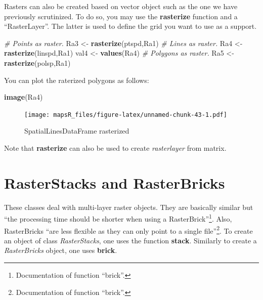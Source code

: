 \documentclass[]{report}
\newenvironment{Shaded}{\begin{snugshade}}{\end{snugshade}}
\newcommand{\CommentTok}[1]{\textcolor[rgb]{0.56,0.35,0.01}{\textit{#1}}}
\newcommand{\KeywordTok}[1]{\textcolor[rgb]{0.13,0.29,0.53}{\textbf{#1}}}
\newcommand{\NormalTok}[1]{#1}
\newcommand{\StringTok}[1]{\textcolor[rgb]{0.31,0.60,0.02}{#1}}
\let\rmarkdownfootnote\footnote%
\def\footnote{\protect\rmarkdownfootnote}
\begin{document}
Rasters can also be created based on vector object such as the one we
have previously scrutinized. To do so, you may use the
\textbf{rasterize} function and a ``RasterLayer''. The latter is used to
define the grid you want to use as a support.

\begin{Shaded}
\begin{Highlighting}[]
\CommentTok{# Points as raster.}
\NormalTok{Ra3 <-}\StringTok{ }\KeywordTok{rasterize}\NormalTok{(ptspd,Ra1)}
\CommentTok{# Lines as raster.}
\NormalTok{Ra4 <-}\StringTok{ }\KeywordTok{rasterize}\NormalTok{(linspd,Ra1)}
\NormalTok{val4 <-}\StringTok{ }\KeywordTok{values}\NormalTok{(Ra4)}
\CommentTok{# Polygons as raster.}
\NormalTok{Ra5 <-}\StringTok{ }\KeywordTok{rasterize}\NormalTok{(polsp,Ra1)}
\end{Highlighting}
\end{Shaded}

You can plot the raterized polygons as follows:

\begin{Shaded}
\begin{Highlighting}[]
\KeywordTok{image}\NormalTok{(Ra4)}
\end{Highlighting}
\end{Shaded}

\begin{figure}
\centering
\texttt{[image: mapsR\_files/figure-latex/unnamed-chunk-43-1.pdf]}
\caption{SpatialLinesDataFrame rasterized}
\end{figure}

Note that \textbf{rasterize} can also be used to create
\emph{rasterlayer} from matrix.

\hypertarget{rasterstacks-and-rasterbricks}{%
\section{RasterStacks and
RasterBricks}\label{rasterstacks-and-rasterbricks}}

These classes deal with multi-layer raster objects. They are basically
similar but ``the processing time should be shorter when using a
RasterBrick''\footnote{Documentation of function ``brick''.}. Also,
RasterBricks ``are less flexible as they can only point to a single
file''\footnote{Documentation of function ``brick''.}. To create an
object of class \emph{RasterStacks}, one uses the function
\textbf{stack}. Similarly to create a \emph{RasterBricks} object, one
uses \textbf{brick}.
\end{document}
